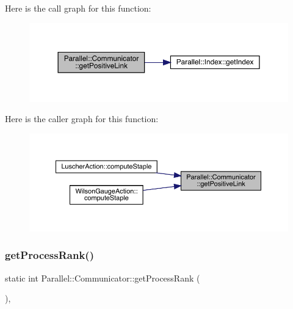 Here is the call graph for this function\+:
\nopagebreak
\begin{figure}[H]
\begin{center}
\leavevmode
\includegraphics[width=350pt]{class_parallel_1_1_communicator_a1c8d402df4a44becc1cab7a762f51432_cgraph}
\end{center}
\end{figure}
Here is the caller graph for this function\+:
\nopagebreak
\begin{figure}[H]
\begin{center}
\leavevmode
\includegraphics[width=350pt]{class_parallel_1_1_communicator_a1c8d402df4a44becc1cab7a762f51432_icgraph}
\end{center}
\end{figure}
\mbox{\label{class_parallel_1_1_communicator_a474ab433da0e83ef372d74e26a7e5cb0}} 
\subsubsection{\texorpdfstring{getProcessRank()}{getProcessRank()}}
{\footnotesize\ttfamily static int Parallel\+::\+Communicator\+::get\+Process\+Rank (\begin{DoxyParamCaption}{ }\end{DoxyParamCaption})\hspace{0.3cm}{\ttfamily [inline]}, {\ttfamily [static]}}

